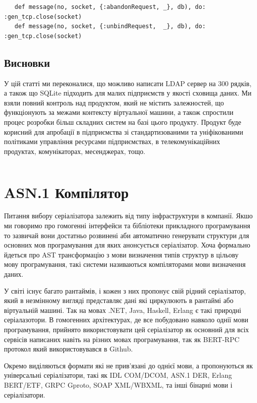 \begin{lstlisting}
   def message(no, socket, {:abandonRequest, _}, db), do: :gen_tcp.close(socket)
   def message(no, socket, {:unbindRequest,  _}, db), do: :gen_tcp.close(socket)
\end{lstlisting}

\subsection{Висновки}

У цій статті ми переконалися, що можливо написати LDAP сервер на 300 рядків, а також що SQLite підходить для малих підприємств у якості сховища даних. Ми взяли повний контроль над продуктом, який не містить залежностей, що функціонують за межами контексту віртуальної машини, а також спростили процес розробки більш складних систем на базі цього продукту. Продукт буде корисний для апробації в підприємства зі стандартизованими та уніфікованими політиками управління ресурсами підприємствах, в телекомунікаційних продуктах, комунікаторах, месенджерах, тощо.

\begin{lstlisting}
\end{lstlisting}

\newpage
\section{ASN.1 Компілятор}

Питання вибору серіалізатора залежить від типу інфраструктури в компанії. Якшо ми говоримо про гомогенні інтерфейси та бібліотеки прикладного програмування то зазвичай вони достатньо розвинені аби автоматично генерувати структури для основних мов програмування для яких анонсується серіалізатор. Хоча формально йдеться про AST трансформацію з мови визначення типів структур в цільову мову програмування, такі системи називаються компіляторами мови визначення даних.

У світі існує багато рантаймів, і кожен з них пропонує свій рідний серіалізатор, який в незмінному вигляді представляє дані які циркулюють в рантаймі або віртуальній машині. Так на мовах .NET, Java, Haskell, Erlang є такі природні серіалазотори. В гомогенних архітектурах, де все побудовано навколо однії мови програмування, прийнято використовувати цей серіалізатор як основний для всіх сервісів написаних навіть на різних мовах програмування, так як BERT-RPC протокол який використовувався в Github.

Окремо виділяються формати які не прив'язані до однієї мови, а пропонуються як універсальні серіалізатори, такі як IDL COM/DCOM, ASN.1 DER, Erlang BERT/ETF, GRPC Gproto, SOAP XML/WBXML, та інші бінарні мови і серіалізатори.

